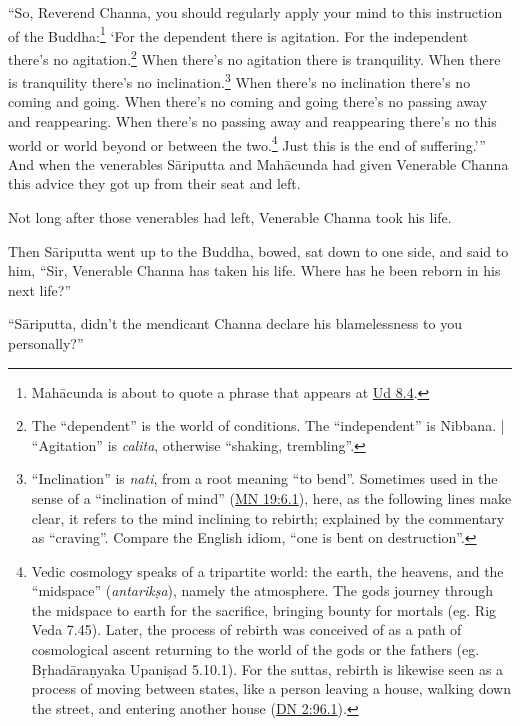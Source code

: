 \documentclass[12pt,openany]{book}%
\begin{document}
“So, Reverend Channa, you should regularly apply your mind to this instruction of the Buddha:\footnote{\textsanskrit{Mahācunda} is about to quote a phrase that appears at \href{https://suttacentral.net/ud8.4/en/sujato}{Ud 8.4}. } ‘For the dependent there is agitation. For the independent there’s no agitation.\footnote{The “dependent” is the world of conditions. The “independent” is Nibbana. | “Agitation” is \textit{calita}, otherwise “shaking, trembling”. } When there’s no agitation there is tranquility. When there is tranquility there’s no inclination.\footnote{“Inclination” is \textit{nati}, from a root meaning “to bend”. Sometimes used in the sense of a “inclination of mind” (\href{https://suttacentral.net/mn19/en/sujato\#6.1}{MN 19:6.1}), here, as the following lines make clear, it refers to the mind inclining to rebirth; explained by the commentary as “craving”. Compare the English idiom, “one is bent on destruction”. } When there’s no inclination there’s no coming and going. When there’s no coming and going there’s no passing away and reappearing. When there’s no passing away and reappearing there’s no this world or world beyond or between the two.\footnote{Vedic cosmology speaks of a tripartite world: the earth, the heavens, and the “midspace” (\textit{\textsanskrit{antarikṣa}}), namely the atmosphere. The gods journey through the midspace to earth for the sacrifice, bringing bounty for mortals (eg. Rig Veda 7.45). Later, the process of rebirth was conceived of as a path of cosmological ascent returning to the world of the gods or the fathers (eg. \textsanskrit{Bṛhadāraṇyaka} \textsanskrit{Upaniṣad} 5.10.1). For the suttas, rebirth is likewise seen as a process of moving between states, like a person leaving a house, walking down the street, and entering another house (\href{https://suttacentral.net/dn2/en/sujato\#96.1}{DN 2:96.1}). } Just this is the end of suffering.’” And when the venerables \textsanskrit{Sāriputta} and \textsanskrit{Mahācunda} had given Venerable Channa this advice they got up from their seat and left. 

Not long after those venerables had left, Venerable Channa took his life. 

Then \textsanskrit{Sāriputta} went up to the Buddha, bowed, sat down to one side, and said to him, “Sir, Venerable Channa has taken his life. Where has he been reborn in his next life?” 

“\textsanskrit{Sāriputta}, didn’t the mendicant Channa declare his blamelessness to you personally?” 
\end{document}
